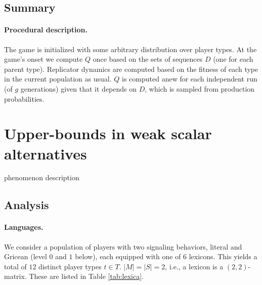 \documentclass[a4paper]{article}
\newcommand{\hl}[1]{\textcolor[rgb]{.8,.33,.0}{#1}}%
\begin{document}
\subsection{Summary}
\paragraph{Procedural description.} The game is initialized with some arbitrary distribution over player types. At the game's onset we compute $Q$ once based on the sets  of sequences $D$ (one for each parent type). Replicator dynamics are computed based on the fitness of each type in the current population as usual. $Q$ is computed anew for each independent run (of $g$ generations) given that it depends on $D$, which is sampled from production probabilities.


\section{Upper-bounds in weak scalar alternatives}
\hl{phenomenon description}

\subsection{Analysis}

\paragraph{Languages.} We consider a population of players with two signaling behaviors, literal and Gricean (level $0$ and $1$ below), each equipped with one of $6$ lexicons. This yields a total of $12$ distinct player types $t \in T$. $|M| = |S| = 2$, i.e., a lexicon is a $(2,2)$-matrix. These are listed in Table \ref{tab:lexica}. 
\end{document}
